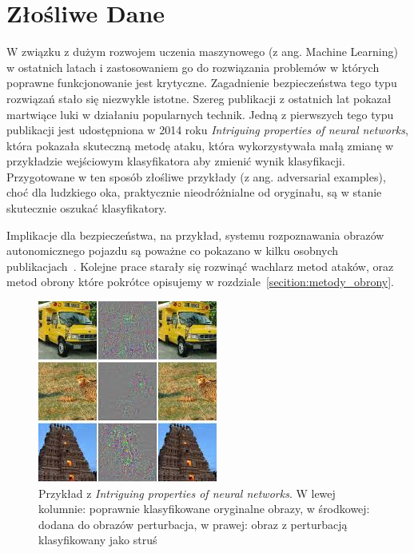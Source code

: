 \documentclass[
    left=2.5cm,         %
    right=2.5cm,        %
    top=2.5cm,          %
    bottom=3cm,         %
    bindingoffset=6mm,  %
    nohyphenation=false %
]{eiti/eiti-thesis}
\begin{document}
\newpage

\section{Złośliwe Dane}
W związku z dużym rozwojem uczenia maszynowego (z ang. Machine Learning) w ostatnich latach i zastosowaniem go do
rozwiązania problemów w których poprawne funkcjonowanie jest krytyczne. Zagadnienie bezpieczeństwa tego typu rozwiązań stało
się niezwykle istotne. Szereg publikacji z ostatnich lat pokazał martwiące luki w działaniu popularnych technik.
Jedną z pierwszych tego typu publikacji jest udostępniona w 2014 roku \textit{Intriguing properties of neural networks}\cite{DBLP:journals/corr/SzegedyZSBEGF13},
która pokazała skuteczną metodę ataku, która wykorzystywała małą zmianę w przykładzie wejściowym klasyfikatora aby zmienić wynik klasyfikacji.
Przygotowane w ten sposób złośliwe przykłady (z ang. adversarial examples), choć dla ludzkiego oka, praktycznie nieodróżnialne od oryginału, są w stanie skutecznie oszukać klasyfikatory.

Implikacje dla bezpieczeństwa, na przykład, systemu rozpoznawania obrazów autonomicznego pojazdu są poważne co
pokazano w kilku osobnych publikacjach~\cite{DBLP:journals/corr/EvtimovEFKLPRS17,DBLP:journals/corr/abs-1907-00374, DBLP:journals/corr/abs-1801-02780}.
Kolejne prace starały się rozwinąć wachlarz metod ataków, oraz metod obrony\cite{DBLP:journals/corr/PapernotMWJS15, DBLP:journals/corr/abs-1801-08926, DBLP:journals/corr/abs-1904-00887} które pokrótce opisujemy w rozdziale~\ref{secition:metody_obrony}.
\begin{figure}[h]
    \begin{center}
        \includegraphics[width=0.75\linewidth]{eiti/adversarial_intriguing.jpg}
    \end{center}
    \caption{Przykład z \textit{Intriguing properties of neural networks}\cite{DBLP:journals/corr/SzegedyZSBEGF13}.
    W lewej kolumnie: poprawnie klasyfikowane oryginalne obrazy, w środkowej: dodana do obrazów perturbacja, w prawej: obraz z perturbacją klasyfikowany jako struś}
\end{figure}
\end{document}
